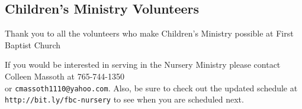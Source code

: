 
\subsection{Children's Ministry Volunteers}
\normalsize{Thank you to all the volunteers who make Children's Ministry possible at First Baptist Church}

\printyearoff



\small{If you would be interested in serving in the Nursery Ministry please contact Colleen Massoth at 765-744-1350 \\ or \texttt{cmassoth1110@yahoo.com}. Also, be sure to check out the updated schedule at \texttt{http://bit.ly/fbc-nursery} to see when you are scheduled next.}

\normalsize{}

 \vfill 
